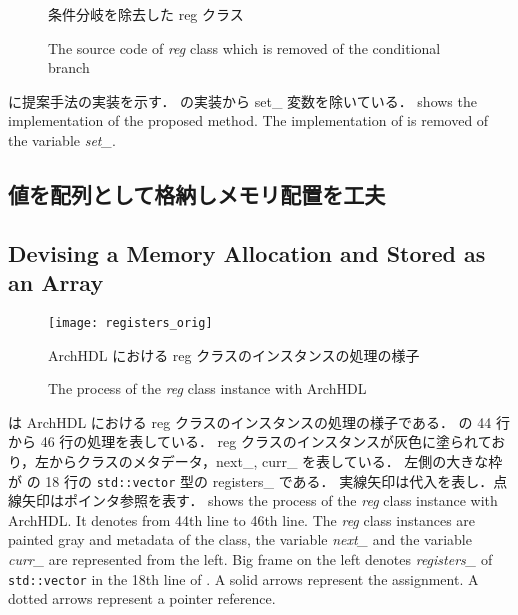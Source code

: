 \begin{figure}[tb]
 
 \caption{条件分岐を除去した reg クラス}
\fi
 \caption{The source code of \textit{reg} class which is removed of the conditional branch}
 \label{src:reg_no_set}
\end{figure}

 に提案手法の実装を示す．
 の実装から set\_ 変数を除いている．
\fi
{} shows the implementation of the proposed method.
The implementation of  is removed of the variable \textit{set\_}.



\subsection{値を配列として格納しメモリ配置を工夫} \label{sss:mem_copy}
\fi
\subsection{Devising a Memory Allocation and Stored as an Array} \label{sss:mem_copy}

\begin{figure}[t]
 \centering
 \texttt{[image: registers\_orig]}
 \caption{ArchHDL における reg クラスのインスタンスの処理の様子}
\fi
 \caption{The process of the \textit{reg} class instance with ArchHDL}
 \label{fig:regs}
\end{figure}

 は ArchHDL における reg クラスのインスタンスの処理の様子である．
 の 44 行から 46 行の処理を表している．
reg クラスのインスタンスが灰色に塗られており，左からクラスのメタデータ，next\_, curr\_ を表している．
左側の大きな枠が の 18 行の \verb`std::vector` 型の registers\_ である．
実線矢印は代入を表し．点線矢印はポインタ参照を表す．
\fi
{} shows the process of the \textit{reg} class instance with ArchHDL.
It denotes  from 44th line to 46th line.
The \textit{reg} class instances are painted gray
and metadata of the class, the variable \textit{next\_} and the variable \textit{curr\_} are represented from the left.
Big frame on the left denotes \textit{registers\_} of \verb`std::vector` in the 18th line of .
A solid arrows represent the assignment.
A dotted arrows represent a pointer reference.

